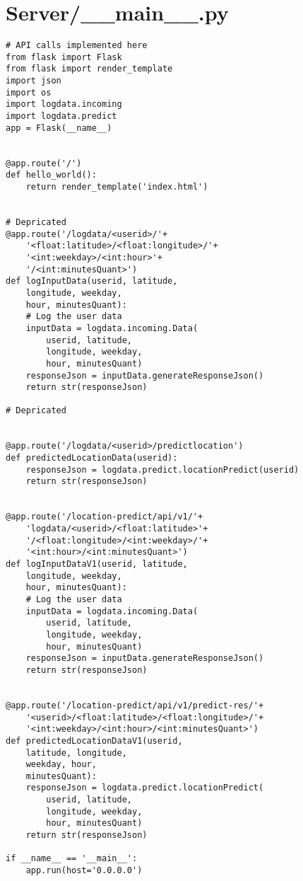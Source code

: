 \documentclass[conference]{IEEEtran}
\begin{document}
\section{Server/\_\_main\_\_.py}
\begin{lstlisting}
# API calls implemented here
from flask import Flask
from flask import render_template
import json
import os
import logdata.incoming
import logdata.predict
app = Flask(__name__)


@app.route('/')
def hello_world():
    return render_template('index.html')


# Depricated
@app.route('/logdata/<userid>/'+
    '<float:latitude>/<float:longitude>/'+
    '<int:weekday>/<int:hour>'+
    '/<int:minutesQuant>')
def logInputData(userid, latitude, 
    longitude, weekday, 
    hour, minutesQuant):
    # Log the user data
    inputData = logdata.incoming.Data(
        userid, latitude, 
        longitude, weekday, 
        hour, minutesQuant)
    responseJson = inputData.generateResponseJson()
    return str(responseJson)

# Depricated


@app.route('/logdata/<userid>/predictlocation')
def predictedLocationData(userid):
    responseJson = logdata.predict.locationPredict(userid)
    return str(responseJson)


@app.route('/location-predict/api/v1/'+
    'logdata/<userid>/<float:latitude>'+
    '/<float:longitude>/<int:weekday>/'+
    '<int:hour>/<int:minutesQuant>')
def logInputDataV1(userid, latitude, 
    longitude, weekday, 
    hour, minutesQuant):
    # Log the user data
    inputData = logdata.incoming.Data(
        userid, latitude, 
        longitude, weekday, 
        hour, minutesQuant)
    responseJson = inputData.generateResponseJson()
    return str(responseJson)


@app.route('/location-predict/api/v1/predict-res/'+
    '<userid>/<float:latitude>/<float:longitude>/'+
    '<int:weekday>/<int:hour>/<int:minutesQuant>')
def predictedLocationDataV1(userid, 
    latitude, longitude, 
    weekday, hour, 
    minutesQuant):
    responseJson = logdata.predict.locationPredict(
        userid, latitude, 
        longitude, weekday, 
        hour, minutesQuant)
    return str(responseJson)

if __name__ == '__main__':
    app.run(host='0.0.0.0')

\end{lstlisting}
\end{document}
